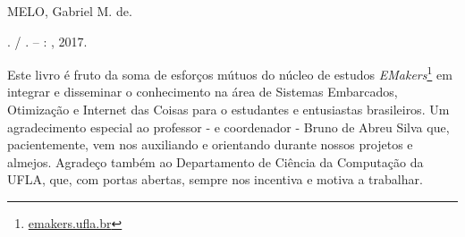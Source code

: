 \documentclass[
	11pt,				%
	openright,			%
	twoside,			%
	a5paper,			%
	english,			%
	french,				%
	spanish,			%
	brazil,				%
	sumario=tradicional
]{abntex2}
\renewcommand{\textual}{%
  \pagestyle{abntbookheadings}%
  \aliaspagestyle{chapter}{abntbookchapfirst}%
  \nouppercaseheads%
  \bookmarksetup{startatroot}%
}
\begin{document}
\vspace*{\fill}

\begin{center}
\end{center}

\begin{mdframed}
\noindent MELO, Gabriel M. de.

\imprimirtitulo. / \imprimirautor. -- \imprimirlocal: \imprimirinstituicao, 2017.

\medskip



\medskip


\end{mdframed}


\begin{agradecimentos}
Este livro é fruto da soma de esforços mútuos do núcleo de estudos \textit{EMakers}\footnote{\url{emakers.ufla.br}} em integrar e disseminar o conhecimento na área de Sistemas Embarcados, Otimização e Internet das Coisas para o estudantes e entusiastas brasileiros. Um agradecimento especial ao professor - e coordenador - Bruno de Abreu Silva que, pacientemente, vem nos auxiliando e orientando durante nossos projetos e almejos. Agradeço também ao Departamento de Ciência da Computação da UFLA, que, com portas abertas, sempre nos incentiva e motiva a trabalhar.
\end{agradecimentos}

\listoffigures*
\cleardoublepage

\listoftables*
\cleardoublepage

\tableofcontents*
\cleardoublepage

\mainmatter
\end{document}
